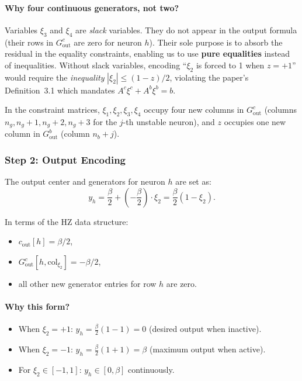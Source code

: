 \documentclass{article}
\begin{document}
\paragraph{Why four continuous generators, not two?}
Variables $\xi_3$ and $\xi_4$ are \emph{slack} variables. They do not appear in the output formula (their rows in $G^c_{\mathrm{out}}$ are zero for neuron $h$). Their sole purpose is to absorb the residual in the equality constraints, enabling us to use \textbf{pure equalities} instead of inequalities. Without slack variables, encoding ``$\xi_2$ is forced to 1 when $z = +1$'' would require the \emph{inequality} $|\xi_2| \leq (1 - z)/2$, violating the paper's Definition~3.1 which mandates $A^c \xi^c + A^b \xi^b = b$.

In the constraint matrices, $\xi_1, \xi_2, \xi_3, \xi_4$ occupy four new columns in $G^c_{\mathrm{out}}$ (columns $n_g, n_g{+}1, n_g{+}2, n_g{+}3$ for the $j$-th unstable neuron), and $z$ occupies one new column in $G^b_{\mathrm{out}}$ (column $n_b{+}j$).

\subsubsection{Step 2: Output Encoding}
\label{sec:step2_output}


The output center and generators for neuron $h$ are set as:
\begin{equation}
\label{eq:case3_output}
\boxed{y_h = \frac{\beta}{2} + \left(-\frac{\beta}{2}\right) \cdot \xi_2 = \frac{\beta}{2}(1 - \xi_2).}
\end{equation}

In terms of the HZ data structure:
\begin{itemize}
    \item $c_{\mathrm{out}}[h] = \beta / 2$,
    \item $G^c_{\mathrm{out}}[h, \mathrm{col}_{\xi_2}] = -\beta / 2$,
    \item all other new generator entries for row $h$ are zero.
\end{itemize}

\paragraph{Why this form?}
\begin{itemize}
    \item When $\xi_2 = +1$: $y_h = \tfrac{\beta}{2}(1-1) = 0$ \quad (desired output when inactive).
    \item When $\xi_2 = -1$: $y_h = \tfrac{\beta}{2}(1+1) = \beta$ \quad (maximum output when active).
    \item For $\xi_2 \in [-1,1]$: $y_h \in [0, \beta]$ continuously.
\end{itemize}
\end{document}
